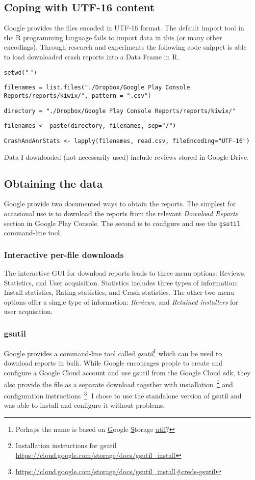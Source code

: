 \subsection{Coping with UTF-16 content}
Google provides the files encoded in UTF-16 format. The default import tool in the R programming language fails to import data in this (or many other encodings). Through research and experiments the following code snippet is able to load downloaded crash reports into a Data Frame in R.

\texttt{setwd("\textbf{$_{\widetilde{~}}$}")} %

\texttt{filenames = list.files("./Dropbox/Google Play Console Reports/reports/kiwix/", pattern = ".csv")}

\texttt{directory = "./Dropbox/Google Play Console Reports/reports/kiwix/"}

\texttt{filenames <- paste(directory, filenames, sep="/")}

\texttt{CrashAndAnrStats <- lapply(filenames, read.csv, fileEncoding="UTF-16")}


Data I downloaded (not necessarily used) include reviews stored in Google Drive.

\subsection{Obtaining the data}
Google provide two documented ways to obtain the reports. The simplest for occasional use is to download the reports from the relevant \emph{Download Reports} section in Google Play Console. The second is to configure and use the \texttt{gsutil} command-line tool.

\subsubsection{Interactive per-file downloads}
The interactive GUI for download reports leads to three menu options: Reviews, Statistics, and User acquisition. Statistics includes three types of information: Install statistics, Rating statistics, and Crash statistics. The other two menu options offer a single type of information: \emph{Reviews}, and \emph{Retained installers} for user acquisition.

\subsubsection{gsutil}
Google provides a command-line tool called \emph{gsutil}\footnote{Perhaps the name is based on \underline{G}oogle \underline{S}torage \underline{util}?} which can be used to download reports in bulk. While Google encourages people to create and configure a Google Cloud account and use gsutil from the Google Cloud sdk, they also provide the file as a separate download together with installation~\footnote{Installation instructions for gsutil \url{https://cloud.google.com/storage/docs/gsutil_install}} and configuration instructions~\footnote{\url{https://cloud.google.com/storage/docs/gsutil_install\#creds-gsutil}}. I chose to use the standalone version of gsutil and was able to install and configure it without problems.  

